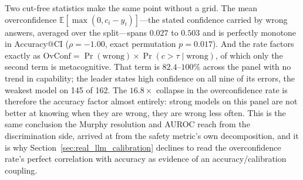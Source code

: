 \documentclass{article}
\begin{document}
Two cut-free statistics make the same point without a grid. The mean overconfidence $\mathbb{E}[\max(0, c_i - y_i)]$---the stated confidence carried by wrong answers, averaged over the split---spans $0.027$ to $0.503$ and is perfectly monotone in Accuracy@CI ($\rho = -1.00$, exact permutation $p = 0.017$). And the rate factors exactly as $\text{OvConf} = \Pr(\text{wrong}) \times \Pr(c > \tau \mid \text{wrong})$, of which only the second term is metacognitive. That term is $82.4$--$100\%$ across the panel with no trend in capability; the leader states high confidence on all nine of its errors, the weakest model on 145 of 162. The $16.8\times$ collapse in the overconfidence rate is therefore the accuracy factor almost entirely: strong models on this panel are not better at knowing when they are wrong, they are wrong less often. This is the same conclusion the Murphy resolution and AUROC reach from the discrimination side, arrived at from the safety metric's own decomposition, and it is why Section~\ref{sec:real_llm_calibration} declines to read the overconfidence rate's perfect correlation with accuracy as evidence of an accuracy/calibration coupling.

\begin{table}[t]
\centering
\caption{Overconfidence under a swept threshold. Columns 2--6 are $\text{OvConf}(\tau)$ under the strict convention ($c_i > \tau$); $\dagger$ marks a cut on which more than 10\% of that model's answers state \emph{exactly} $\tau$, so the tie convention alone moves that block across the line. \textbf{$\mathbb{E}[\text{OC}]$} is the threshold-free mean overconfidence $\mathbb{E}[\max(0, c_i - y_i)]$. \textbf{$\Pr(\text{err} \mid c{>}0.7)$} is the error rate among confidently-stated answers---what a downstream consumer of those answers faces---and \textbf{$\Pr(c{>}0.7 \mid \text{err})$} is the metacognitive factor of the rate, which is flat in capability where the rate itself is not.}
\label{tab:real_llm_overconfidence}
\end{table}
\end{document}
